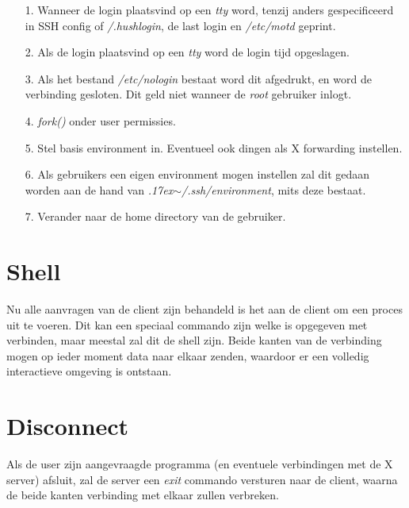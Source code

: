\begin{itemize}
\item[1.] Wanneer de login plaatsvind op een \emph{tty} word, tenzij anders gespecificeerd in SSH config of \emph{\customtilde/.hushlogin}, de last login en \emph{/etc/motd} geprint. 
\item[2.] Als de login plaatsvind op een \emph{tty} word de login tijd opgeslagen. 
\item[3.] Als het bestand \emph{/etc/nologin} bestaat word dit afgedrukt, en word de verbinding gesloten. Dit geld niet wanneer de \emph{root} gebruiker inlogt. %
\item[4.] \emph{fork()} onder user permissies. 
\item[5.] Stel basis environment in. Eventueel ook dingen als X forwarding instellen. 
\item[6.] Als gebruikers een eigen environment mogen instellen zal dit gedaan worden aan de hand van \emph{{\raise.17ex\hbox{$\scriptstyle\sim$}}/.ssh/environment}, mits deze bestaat. 
\item[7.] Verander naar de home directory van de gebruiker. 
\end{itemize}

\section{Shell}
Nu alle aanvragen van de client zijn behandeld is het aan de client om een proces uit te voeren. Dit kan een speciaal commando zijn welke is opgegeven met verbinden, maar meestal zal dit de shell zijn. Beide kanten van de verbinding mogen op ieder moment data naar elkaar zenden, waardoor er een volledig interactieve omgeving is ontstaan. 

\section{Disconnect}
Als de user zijn aangevraagde programma (en eventuele verbindingen met de X server) afsluit, zal de server een \emph{exit} commando versturen naar de client, waarna de beide kanten verbinding met elkaar zullen verbreken. 

